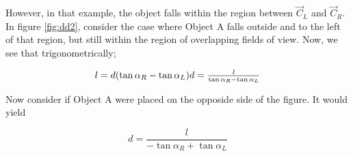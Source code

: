 \documentclass{article}
\begin{document}
However, in that example, the object falls within the region between $\vec{C}_L$ and $\vec{C}_R$. 
In figure \ref{fig:dd2}, consider the case where Object A falls outside and to the left of that region, but still within the region of overlapping fields of view.
Now, we see that trigonometrically;

\begin{equation}
    \label{eq:outside_l}
    l = d(\tan\alpha_R - \tan\alpha_L) $$

    $$ d = \frac{l}{\tan\alpha_R - \tan\alpha_L}
\end{equation}

Now consider if Object A were placed on the opposide side of the figure.
It would yield

\begin{equation}
    \label{eq:outside_r}
    d = \frac{l}{- \tan\alpha_R + \tan\alpha_L}
\end{equation}
\end{document}
